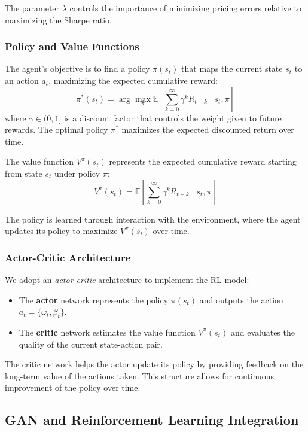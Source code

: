 The parameter $\lambda$ controls the importance of minimizing pricing errors relative to maximizing the Sharpe ratio.

\subsubsection{Policy and Value Functions}

The agent's objective is to find a policy $\pi(s_t)$ that maps the current state $s_t$ to an action $a_t$, maximizing the expected cumulative reward:
\[
\pi^*(s_t) = \arg \max_\pi \mathbb{E}\left[\sum_{k=0}^\infty \gamma^k R_{t+k} \mid s_t, \pi \right]
\]
where $\gamma \in (0, 1]$ is a discount factor that controls the weight given to future rewards. The optimal policy $\pi^*$ maximizes the expected discounted return over time.

The value function $V^\pi(s_t)$ represents the expected cumulative reward starting from state $s_t$ under policy $\pi$:
\[
V^\pi(s_t) = \mathbb{E}\left[\sum_{k=0}^\infty \gamma^k R_{t+k} \mid s_t, \pi \right]
\]

The policy is learned through interaction with the environment, where the agent updates its policy to maximize $V^\pi(s_t)$ over time.

\subsubsection{Actor-Critic Architecture}

We adopt an \textit{actor-critic} architecture to implement the RL model:
\begin{itemize}
    \item The \textbf{actor} network represents the policy $\pi(s_t)$ and outputs the action $a_t = \{ \omega_t, \beta_t \}$.
    \item The \textbf{critic} network estimates the value function $V^\pi(s_t)$ and evaluates the quality of the current state-action pair.
\end{itemize}

The critic network helps the actor update its policy by providing feedback on the long-term value of the actions taken. This structure allows for continuous improvement of the policy over time.

\subsection{GAN and Reinforcement Learning Integration}

